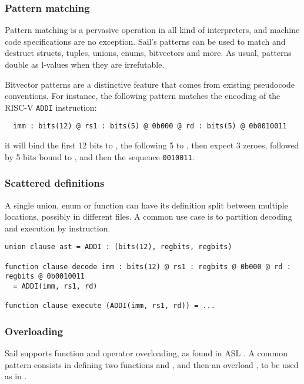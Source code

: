 \subsubsection{Pattern matching}

Pattern matching is a pervasive operation in all kind of interpreters, and machine code specifications are no exception. Sail's patterns can be used to match and destruct structs, tuples, unions, enums, bitvectors and more. As usual, patterns double as l-values when they are irrefutable.

Bitvector patterns are a distinctive feature that comes from existing pseudocode conventions. For instance, the following pattern matches the encoding of the RISC-V \texttt{ADDI} instruction:
\begin{verbatim}
  imm : bits(12) @ rs1 : bits(5) @ 0b000 @ rd : bits(5) @ 0b0010011
\end{verbatim}%
it will bind the first 12 bits to , the following 5 to , then expect 3 zeroes, followed by 5 bits bound to , and then the sequence \texttt{0010011}.

\subsubsection{Scattered definitions}

A single union, enum or function can have its definition split between multiple locations, possibly in different files. A common use case is to partition decoding and execution by instruction.

\begin{verbatim}
union clause ast = ADDI : (bits(12), regbits, regbits)

function clause decode imm : bits(12) @ rs1 : regbits @ 0b000 @ rd : regbits @ 0b0010011
  = ADDI(imm, rs1, rd)

function clause execute (ADDI(imm, rs1, rd)) = ...
\end{verbatim}%

\subsubsection{Overloading}

Sail supports function and operator overloading, as found \eg in ASL \cite{Reid2016}. A common pattern consists in defining two functions  and , and then an overload , to be used as in .

